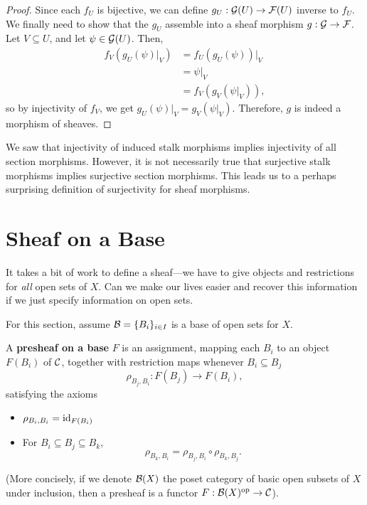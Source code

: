 \documentclass[12pt]{article}
\begin{document}
\begin{proof}
    Since each $f_U$ is bijective, we can define $g_U: \mathcal{G}(U)\to \mathcal{F}(U)$ inverse to $f_U$. We finally need to show that the $g_U$ assemble into a sheaf morphism $g:\mathcal{G}\to \mathcal{F}$. Let $V\subseteq U$, and let $\psi\in \mathcal{G}(U)$. Then,
    \begin{align*}
        f_V(g_U(\psi)|_V) &= f_U(g_U(\psi))|_V\\
        &= \psi|_V\\
        &= f_V(g_V(\psi|_V)),
    \end{align*}
    so by injectivity of $f_V$, we get $g_U(\psi)|_V = g_V(\psi|_V)$. Therefore, $g$ is indeed a morphism of sheaves.
\end{proof}

\begin{rmk}
    We saw that injectivity of induced stalk morphisms implies injectivity of all section morphisms. However, it is not necessarily true that surjective stalk morphisms implies surjective section morphisms. This leads us to a perhaps surprising definition of surjectivity for sheaf morphisms.
\end{rmk}




\section{Sheaf on a Base}

It takes a bit of work to define a sheaf---we have to give objects and restrictions for \textit{all} open sets of $X$. Can we make our lives easier and recover this information if we just specify information on open sets.

For this section, assume $\mathcal{B} = \{B_i\}_{i\in I}$ is a base of open sets for $X$.

\begin{defn}
    A \textbf{presheaf on a base} $F$ is an assignment, mapping each $B_i$ to an object $F(B_i)$ of $\mathcal{C}$, together with restriction maps whenever $B_i \subseteq B_j$
    \[\rho_{B_j, B_i}: F(B_j) \to F(B_i),\]
    satisfying the axioms
    \begin{itemize}
        \item $\rho_{B_i,B_i} = \mathrm{id}_{F(B_i)}$
        \item For $B_i \subseteq B_j \subseteq B_k$,
        \[\rho_{B_k,B_i} = \rho_{B_j,B_i} \circ \rho_{B_k,B_j}.\]
    \end{itemize}
    (More concisely, if we denote $\mathcal{B}(X)$ the poset category of basic open subsets of $X$ under inclusion, then a presheaf is a functor $F: \mathcal{B}(X)^{\mathrm{op}} \to \mathcal{C}$).
\end{defn}
\end{document}

